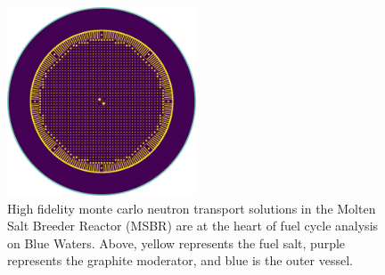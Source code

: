 \documentclass[letterpaper]{article}
\begin{document}
\begin{figure}[ht]
        \begin{center}
                \includegraphics[width=0.5\textwidth]{plan_view_ser.png}
        \end{center}
        \caption{High fidelity monte carlo neutron transport solutions in the
                Molten Salt Breeder Reactor (MSBR) are at the heart of fuel cycle
        analysis on Blue Waters. Above, yellow represents the fuel salt, purple 
represents the graphite moderator, and blue is the outer vessel.}
        \label{fig:plan_view}
\end{figure}
\end{document}
